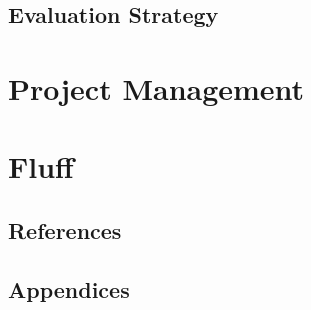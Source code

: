 \documentclass[a4paper,11pt]{report}
\begin{document}
\section{Evaluation Strategy}

\chapter{Project Management}

\chapter{Fluff}

\section{References}

\section{Appendices}
\end{document}
